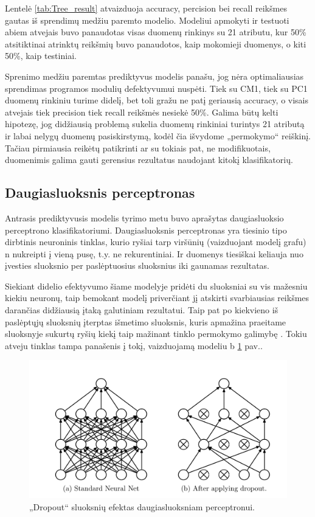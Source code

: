 \documentclass{VUMIFPSbakalaurinis}
\begin{document}
Lentelė \ref{tab:Tree_result} atvaizduoja accuracy, percision bei recall reikšmes gautas iš sprendimų medžiu paremto modelio. Modeliui apmokyti ir testuoti abiem atvejais buvo panaudotas visas duomenų rinkinys su 21 atributu, kur 50\% atsitiktinai atrinktų reikšmių buvo panaudotos, kaip mokomieji duomenys, o kiti 50\%, kaip testiniai.

Sprenimo medžiu paremtas prediktyvus modelis panašu, jog nėra optimaliausias sprendimas programos modulių defektyvumui nuspėti. Tiek su CM1, tiek su PC1 duomenų rinkiniu turime didelį, bet toli gražu ne patį geriausią accuracy, o visais atvejais tiek precision tiek recall reikšmės nesiekė 50\%. Galima būtų kelti hipotezę, jog didžiausią problemą sukelia duomenų rinkiniai turintys 21 atributą ir labai nelygų duomenų pasiskirstymą, kodėl čia išvydome „permokymo“ reiškinį. Tačiau pirmiausia reikėtų patikrinti ar su tokiais pat, ne modifikuotais, duomenimis galima gauti gerensius rezultatus naudojant kitokį klasifikatorių.

\subsection{Daugiasluoksnis perceptronas}
Antrasis prediktyvusis modelis tyrimo metu buvo aprašytas daugiasluoksio perceptrono klasifikatoriumi. Daugiasluoksnis perceptronas yra tiesinio tipo dirbtinis neuroninis tinklas, kurio ryšiai tarp viršūnių (vaizduojant modelį grafu) n nukreipti į vieną pusę, t.y. ne rekurentiniai. Ir duomenys tiesiškai keliauja nuo įvesties sluoksnio per paslėptuosius sluoksnius iki gaunamas rezultatas.

Siekiant didelio efektyvumo šiame modelyje pridėti du sluoksniai su vis mažesniu kiekiu neuronų, taip bemokant modelį priverčiant jį atskirti svarbiausias reikšmes darančias didžiausią įtaką galutiniam rezultatui. Taip pat po kiekvieno iš paslėptųjų sluoksnių įterptas išmetimo sluoksnis, kuris apmažina praeitame sluoksnyje sukurtų ryšių kiekį taip mažinant tinklo permokymo galimybę \cite{JMLR:v15:srivastava14a}. Tokiu atveju tinklas tampa panašenis į tokį, vaizduojamą modeliu b \ref{img:dropout} pav..

\begin{figure}[H]
    \centering
    \includegraphics[scale=0.5]{img/dropout}
    \caption{„Dropout“ sluoksnių efektas daugiasluoksniam perceptronui.}
    \label{img:dropout}
\end{figure}
\end{document}
